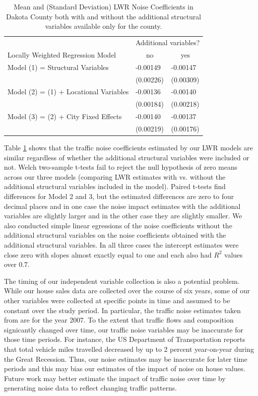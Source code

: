 \documentclass{article}\usepackage{graphicx, color}
\begin{document}
\begin{table}[ht]
\begin{center}
\caption{Mean and (Standard Deviation) LWR Noise Coefficients in Dakota County both with and without the additional structural variables available only for the county.}\label{tab:Dak}
\begin{tabular}{lll}
 & \multicolumn{2}{c}{Additional variables?} \\
Locally Weighted Regression Model & \multicolumn{1}{c}{no} & \multicolumn{1}{c}{yes} \\ \hline
Model (1) = Structural Variables & -0.00149 & -0.00147 \\ 
   & (0.00226) & (0.00309) \\ 
Model (2) = (1) + Locational Variables & -0.00136 & -0.00140 \\ 
   & (0.00184) & (0.00218) \\ 
Model (3) = (2) + City Fixed Effects & -0.00140 & -0.00137 \\ 
   & (0.00219) & (0.00176) \\ 
\end{tabular}
\end{center}
\end{table}

Table \ref{tab:Dak} shows that the traffic noise coefficients estimated by our LWR models are similar regardless of whether the additional structural variables were included or not. Welch two-sample t-tests fail to reject the null hypothesis of zero means across our three models (comparing LWR estimates with vs. without the additional structural variables included in the model). Paired t-tests find differences for Model 2 and 3, but the estimated differences are zero to four decimal places and in one case the noise impact estimates with the additional variables are slightly larger and in the other case they are slightly smaller. We also conducted simple linear egressions of the noise coefficients without the additional structural variables on the noise coefficients obtained with the additional structural variables. In all three cases the intercept estimates were close zero with slopes almost exactly equal to one and each also had $R^2$ values over 0.7. 

The timing of our independent variable collection is also a potential problem. While our house sales data are collected over the course of six years, some of our other variables were collected at specific points in time and assumed to be constant over the study period. In particular, the traffic noise estimates taken from \citet{Nega2012} are for the year 2007. To the extent that traffic flows and composition signicantly changed over time, our traffic noise variables may be inaccurate for those time periods. For instance, the US Department of Transportation reports that total vehicle miles travelled decreased by up to 2 percent year-on-year during the Great Recession. Thus, our noise estimates may be inaccurate for later time periods and this may bias our estimates of the impact of noise on house values. Future work may better estimate the impact of traffic noise over time by generating noise data to reflect changing traffic patterns.
\end{document}

